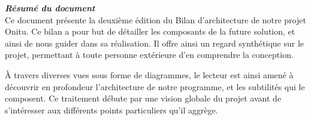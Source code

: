 \thispagestyle{empty}
\vspace*{10mm}

\textbf{\emph{\textcolor{epiBlue}{\large{Résumé du document} } } }\\

Ce document présente la deuxième édition du Bilan d'architecture de notre projet Onitu. Ce bilan a pour but de détailler les composants de la future solution, et ainsi de nous guider dans sa réalisation. Il offre ainsi un regard synthétique sur le projet, permettant à toute personne extérieure d'en comprendre la conception.

À travers diverses vues sous forme de diagrammes, le lecteur est ainsi amené à découvrir en profondeur l'architecture de notre programme, et les subtilités qui le composent. Ce traitement débute par une vision globale du projet avant de s'intéresser aux différents points particuliers qu'il aggrège.

\clearpage
